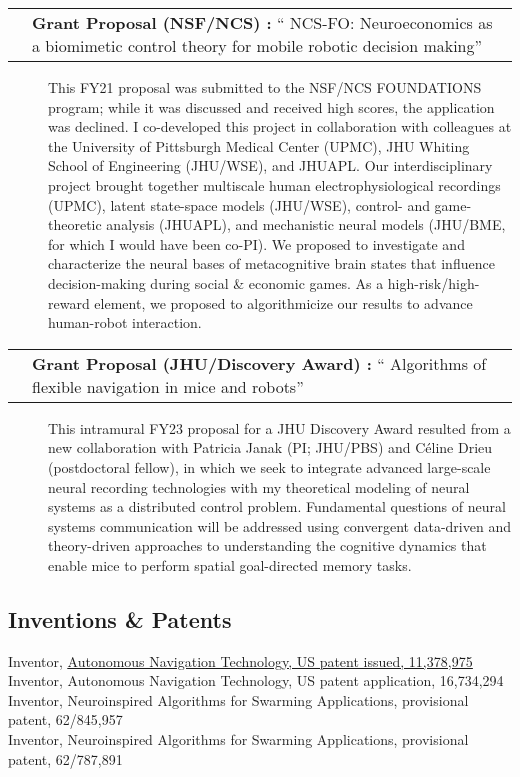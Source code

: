 \documentclass[10pt]{article}
\makeatletter
\newcommand{\itemtitle}[1]{{\color{hopkinsblue}\ul{#1}}}
\newcommand{\unpubtitle}[1]{{\color{hopkinsblue} #1}}
\newcommand{\researchnote}[1]{
  \begin{description}
    \item[] {\hspace{2.2ex}\color{darkgray} #1}
  \end{description}
}
\newcommand{\researchactivity}[4]{
  \begin{minipage}[t]{\textwidth}
    \begin{tabular}{@{\hspace{2ex}}l>{\raggedright\arraybackslash}p{.8\textwidth}}
      \makebox[1.2in][l]{#1} & \textbf{#2:}
      ``\unpubtitle{#3}'' 
    \end{tabular}
  \researchnote{\hspace{1ex} #4}
  \end{minipage}
  \medbreak
}
\newcommand{\lefttabline}[3]{\hspace{2ex}\makebox[#1][l]{#2} #3\\}
\makeatother
\begin{document}
\researchactivity
{Feb. 26, 2020}
{Grant Proposal (NSF/NCS) }
{NCS-FO: Neuroeconomics as a biomimetic control theory for mobile robotic
decision making}
{This FY21 proposal was submitted to the NSF/NCS FOUNDATIONS program; while
  it was discussed and received high scores, the application was declined. I
  co-developed this project in collaboration with colleagues at the University of
  Pittsburgh Medical Center (UPMC), JHU Whiting School of Engineering (JHU/WSE),
  and JHUAPL. Our interdisciplinary project brought together multiscale human
  electrophysiological recordings (UPMC), latent state-space models (JHU/WSE),
  control- and game-theoretic analysis (JHUAPL), and mechanistic neural models
  (JHU/BME, for which I would have been co-PI). We proposed to investigate and
  characterize the neural bases of metacognitive brain states that influence
  decision-making during social \& economic games. As a high-risk/high-reward
  element, we proposed to algorithmicize our results to advance human-robot
interaction.}

\researchactivity
{Jan. 14, 2022}
{Grant Proposal (JHU/Discovery Award) }
{Algorithms of flexible navigation in mice and robots}
{This intramural FY23 proposal for a JHU Discovery Award resulted from a new
  collaboration with Patricia Janak (PI; JHU/PBS) and Céline Drieu (postdoctoral
  fellow), in which we seek to integrate advanced large-scale neural recording
  technologies with my theoretical modeling of neural systems as a distributed
  control problem. Fundamental questions of neural systems communication will
  be addressed using convergent data-driven and theory-driven approaches
  to understanding the cognitive dynamics that enable mice to perform spatial
goal-directed memory tasks.}


\smallskip
\subsection*{Inventions \& Patents}
\label{sec:patents}

\lefttabline{0.8in}{7/5/2022}{Inventor, 
  \href{https://www.freepatentsonline.com/11378975.html}{\itemtitle{Autonomous
Navigation Technology, US patent issued, 11,378,975}}}
\lefttabline{0.8in}{1/3/2020}{Inventor, Autonomous Navigation Technology, US
patent application, 16,734,294}
\lefttabline{0.8in}{5/10/2019}{Inventor, Neuroinspired Algorithms for Swarming
Applications, provisional patent, 62/845,957}
\lefttabline{0.8in}{1/3/2019}{Inventor, Neuroinspired Algorithms for Swarming
Applications, provisional patent, 62/787,891}
\end{document}

